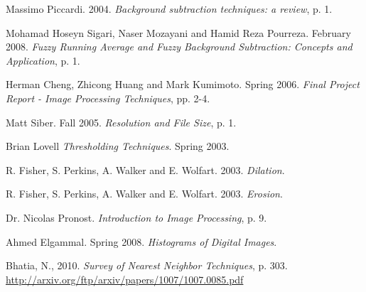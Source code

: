 \begin{thebibliography}{}



 Massimo Piccardi. 2004. \emph{Background subtraction techniques: a review}, p. 1.

 Mohamad Hoseyn Sigari, Naser Mozayani and Hamid Reza Pourreza. February 2008. \emph{Fuzzy Running Average and Fuzzy Background Subtraction: Concepts and Application}, p. 1.

 Herman Cheng, Zhicong Huang and Mark Kumimoto. Spring 2006. \emph{Final Project Report - Image Processing Techniques}, pp. 2-4.

 Matt Siber. Fall 2005. \emph{Resolution and File Size}, p. 1.

 Brian Lovell \emph{Thresholding Techniques}. Spring 2003.

 R. Fisher, S. Perkins, A. Walker and E. Wolfart. 2003. \emph{Dilation}.

 R. Fisher, S. Perkins, A. Walker and E. Wolfart. 2003. \emph{Erosion}.

 Dr. Nicolas Pronost. \emph{Introduction to Image Processing}, p. 9.

 Ahmed Elgammal. Spring 2008. \emph{Histograms of Digital Images}.

 Bhatia, N., 2010. \emph{Survey of Nearest Neighbor Techniques}, p. 303. \url{http://arxiv.org/ftp/arxiv/papers/1007/1007.0085.pdf}








\end{thebibliography}